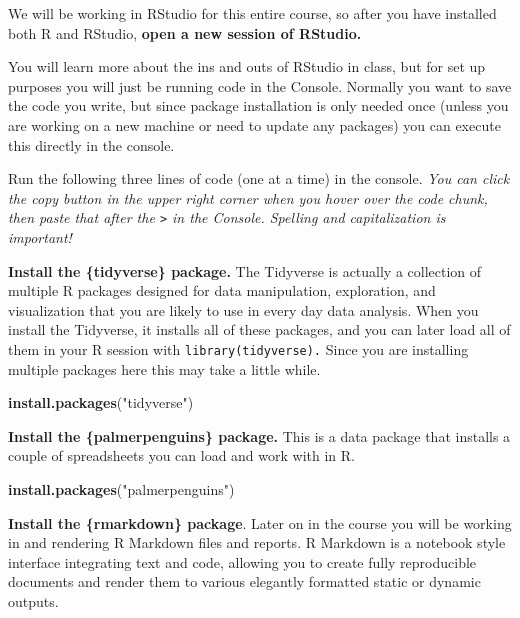 \documentclass[
]{book}
\newenvironment{Shaded}{\begin{snugshade}}{\end{snugshade}}
\newcommand{\FunctionTok}[1]{\textcolor[rgb]{0.13,0.29,0.53}{\textbf{#1}}}
\newcommand{\NormalTok}[1]{#1}
\newcommand{\StringTok}[1]{\textcolor[rgb]{0.31,0.60,0.02}{#1}}
\begin{document}
We will be working in RStudio for this entire course, so after you have installed both R and RStudio, \textbf{open a new session of RStudio.}

You will learn more about the ins and outs of RStudio in class, but for set up purposes you will just be running code in the Console. Normally you want to save the code you write, but since package installation is only needed once (unless you are working on a new machine or need to update any packages) you can execute this directly in the console.

Run the following three lines of code (one at a time) in the console. \emph{You can click the copy button in the upper right corner when you hover over the code chunk, then paste that after the \texttt{\textgreater{}} in the Console. Spelling and capitalization is important!}

\textbf{Install the \{tidyverse\} package.} The Tidyverse is actually a collection of multiple R packages designed for data manipulation, exploration, and visualization that you are likely to use in every day data analysis. When you install the Tidyverse, it installs all of these packages, and you can later load all of them in your R session with \texttt{library(tidyverse).} Since you are installing multiple packages here this may take a little while.

\begin{Shaded}
\begin{Highlighting}[]
\FunctionTok{install.packages}\NormalTok{(}\StringTok{"tidyverse"}\NormalTok{)}
\end{Highlighting}
\end{Shaded}

\textbf{Install the \{palmerpenguins\} package.} This is a data package that installs a couple of spreadsheets you can load and work with in R.

\begin{Shaded}
\begin{Highlighting}[]
\FunctionTok{install.packages}\NormalTok{(}\StringTok{"palmerpenguins"}\NormalTok{)}
\end{Highlighting}
\end{Shaded}

\textbf{Install the \{rmarkdown\} package}. Later on in the course you will be working in and rendering R Markdown files and reports. R Markdown is a notebook style interface integrating text and code, allowing you to create fully reproducible documents and render them to various elegantly formatted static or dynamic outputs.
\end{document}
